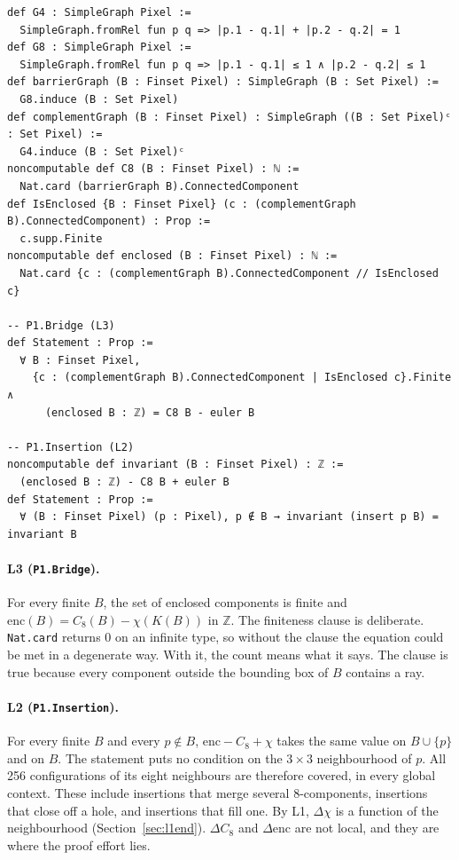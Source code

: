 \documentclass[11pt]{article}
\theoremstyle{definition}
\theoremstyle{remark}
\begin{document}
\begin{lstlisting}[caption={Definitions and the two proposed statements (each Statement lives in its own module).},label={lst:defs}]
def G4 : SimpleGraph Pixel :=
  SimpleGraph.fromRel fun p q => |p.1 - q.1| + |p.2 - q.2| = 1
def G8 : SimpleGraph Pixel :=
  SimpleGraph.fromRel fun p q => |p.1 - q.1| ≤ 1 ∧ |p.2 - q.2| ≤ 1
def barrierGraph (B : Finset Pixel) : SimpleGraph (B : Set Pixel) :=
  G8.induce (B : Set Pixel)
def complementGraph (B : Finset Pixel) : SimpleGraph ((B : Set Pixel)ᶜ : Set Pixel) :=
  G4.induce (B : Set Pixel)ᶜ
noncomputable def C8 (B : Finset Pixel) : ℕ :=
  Nat.card (barrierGraph B).ConnectedComponent
def IsEnclosed {B : Finset Pixel} (c : (complementGraph B).ConnectedComponent) : Prop :=
  c.supp.Finite
noncomputable def enclosed (B : Finset Pixel) : ℕ :=
  Nat.card {c : (complementGraph B).ConnectedComponent // IsEnclosed c}

-- P1.Bridge (L3)
def Statement : Prop :=
  ∀ B : Finset Pixel,
    {c : (complementGraph B).ConnectedComponent | IsEnclosed c}.Finite ∧
      (enclosed B : ℤ) = C8 B - euler B

-- P1.Insertion (L2)
noncomputable def invariant (B : Finset Pixel) : ℤ :=
  (enclosed B : ℤ) - C8 B + euler B
def Statement : Prop :=
  ∀ (B : Finset Pixel) (p : Pixel), p ∉ B → invariant (insert p B) = invariant B
\end{lstlisting}

\paragraph{L3 (\texttt{P1.Bridge}).} For every finite $B$, the set of enclosed
components is finite and $\mathrm{enc}(B) = C_8(B)-\chi(K(B))$ in $\mathbb{Z}$.
The finiteness clause is deliberate. \texttt{Nat.card} returns $0$ on an
infinite type, so without the clause the equation could be met in a degenerate
way. With it, the count means what it says. The clause is true because every
component outside the bounding box of $B$ contains a ray.

\paragraph{L2 (\texttt{P1.Insertion}).} For every finite $B$ and every
$p\notin B$, $\mathrm{enc}-C_8+\chi$ takes the same value on $B\cup\{p\}$ and on
$B$. The statement puts no condition on the $3\times3$ neighbourhood of $p$. All
256 configurations of its eight neighbours are therefore covered, in every global
context. These include insertions that merge several 8-components, insertions
that close off a hole, and insertions that fill one. By L1, $\Delta\chi$ is a
function of the neighbourhood (Section~\ref{sec:l1end}). $\Delta C_8$ and
$\Delta\mathrm{enc}$ are not local, and they are where the proof effort lies.
\end{document}
